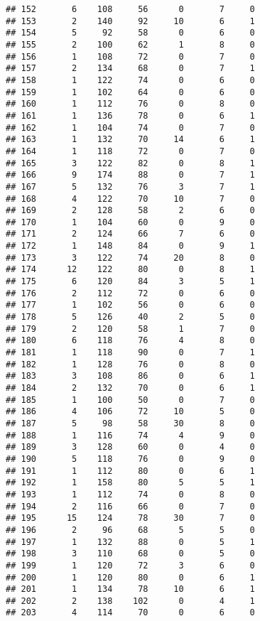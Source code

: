 \documentclass[
]{article}
\begin{document}
\begin{verbatim}
## 152       6    108     56      0       7     0
## 153       2    140     92     10       6     1
## 154       5     92     58      0       6     0
## 155       2    100     62      1       8     0
## 156       1    108     72      0       7     0
## 157       2    134     68      0       7     1
## 158       1    122     74      0       6     0
## 159       1    102     64      0       6     0
## 160       1    112     76      0       8     0
## 161       1    136     78      0       6     1
## 162       1    104     74      0       7     0
## 163       1    132     70     14       6     1
## 164       1    118     72      0       7     0
## 165       3    122     82      0       8     1
## 166       9    174     88      0       7     1
## 167       5    132     76      3       7     1
## 168       4    122     70     10       7     0
## 169       2    128     58      2       6     0
## 170       1    104     60      0       9     0
## 171       2    124     66      7       6     0
## 172       1    148     84      0       9     1
## 173       3    122     74     20       8     0
## 174      12    122     80      0       8     1
## 175       6    120     84      3       5     1
## 176       2    112     72      0       6     0
## 177       1    102     56      0       6     0
## 178       5    126     40      2       5     0
## 179       2    120     58      1       7     0
## 180       6    118     76      4       8     0
## 181       1    118     90      0       7     1
## 182       1    128     76      0       8     0
## 183       3    108     86      0       6     1
## 184       2    132     70      0       6     1
## 185       1    100     50      0       7     0
## 186       4    106     72     10       5     0
## 187       5     98     58     30       8     0
## 188       1    116     74      4       9     0
## 189       3    128     60      0       4     0
## 190       5    118     76      0       9     0
## 191       1    112     80      0       6     1
## 192       1    158     80      5       5     1
## 193       1    112     74      0       8     0
## 194       2    116     66      0       7     0
## 195      15    124     78     30       7     0
## 196       2     96     68      5       5     0
## 197       1    132     88      0       5     1
## 198       3    110     68      0       5     0
## 199       1    120     72      3       6     0
## 200       1    120     80      0       6     1
## 201       1    134     78     10       6     1
## 202       2    138    102      0       4     1
## 203       4    114     70      0       6     0

\end{verbatim}
\end{document}
